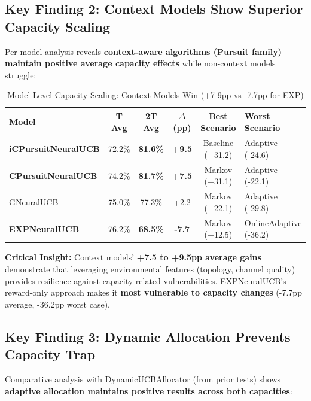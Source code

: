 \documentclass[11pt,a4paper]{article}
\newcommand{\critical}[1]{\textcolor{criticalcolor}{\textbf{#1}}}
\newcommand{\success}[1]{\textcolor{successcolor}{\textbf{#1}}}
\begin{document}
\subsection{Key Finding 2: Context Models Show Superior Capacity Scaling}

Per-model analysis reveals \textbf{context-aware algorithms (Pursuit family) maintain positive average capacity effects} while non-context models struggle:

\vspace{-0.4cm}
\begin{table}[H]
\scriptsize
\centering
\begin{tabular}{lccccl}
\toprule
\textbf{Model} & \textbf{T Avg} & \textbf{2T Avg} & \textbf{$\Delta$ (pp)} & \textbf{Best Scenario} & \textbf{Worst Scenario} \\
\midrule
\success{iCPursuitNeuralUCB} & 72.2\% & \success{81.6\%} & \success{+9.5} & Baseline (+31.2) & Adaptive (-24.6) \\
\success{CPursuitNeuralUCB} & 74.2\% & \success{81.7\%} & \success{+7.5} & Markov (+31.1) & Adaptive (-22.1) \\
GNeuralUCB & 75.0\% & 77.3\% & +2.2 & Markov (+22.1) & Adaptive (-29.8) \\
\critical{EXPNeuralUCB} & 76.2\% & \critical{68.5\%} & \critical{-7.7} & Markov (+12.5) & OnlineAdaptive (-36.2) \\
\bottomrule
\end{tabular}
\vspace{-0.2cm}
\caption{Model-Level Capacity Scaling: Context Models Win (+7-9pp vs -7.7pp for EXP)}
\end{table}

\vspace{-0.2cm}
\textbf{Critical Insight:} Context models' \textbf{+7.5 to +9.5pp average gains} demonstrate that leveraging environmental features (topology, channel quality) provides resilience against capacity-related vulnerabilities. EXPNeuralUCB's reward-only approach makes it \critical{most vulnerable to capacity changes} (-7.7pp average, -36.2pp worst case).

\newpage
\subsection{Key Finding 3: Dynamic Allocation Prevents Capacity Trap}

Comparative analysis with DynamicUCBAllocator (from prior tests) shows \textbf{adaptive allocation maintains positive results across both capacities}:
\end{document}
